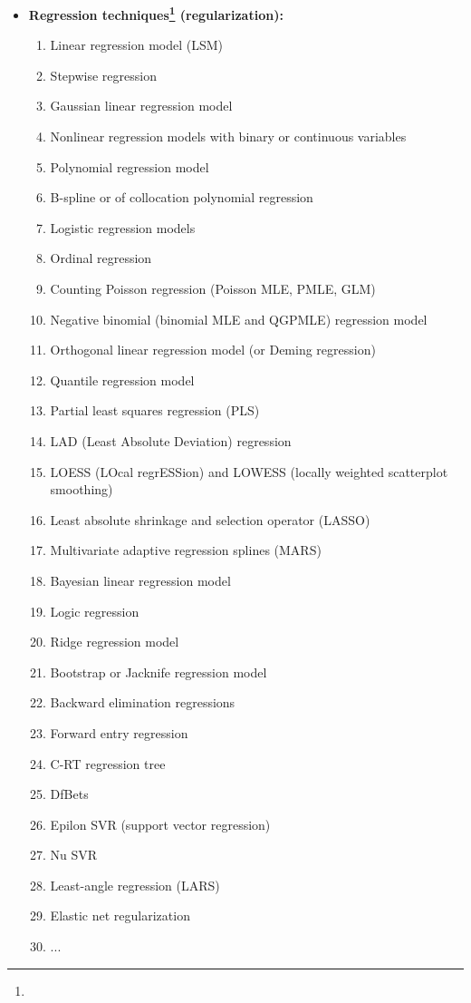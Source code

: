 \begin{itemize}
		\item \textbf{Regression techniques\footnote{} (regularization):}
		\begin{multicols}{2}
		\begin{enumerate}
			\item Linear regression model (LSM)
			\item Stepwise regression
			\item Gaussian linear regression model		
			\item Nonlinear regression models with binary or continuous variables 
			\item Polynomial regression model 
			\item B-spline or of collocation polynomial regression		
			\item Logistic regression models
			\item Ordinal regression
			\item Counting Poisson regression (Poisson MLE, PMLE, GLM) 
			\item Negative binomial (binomial MLE and QGPMLE) regression model		
			\item Orthogonal linear regression model (or Deming regression)
			\item Quantile regression model	
			\item Partial least squares regression (PLS)
			\item LAD (Least Absolute Deviation) regression 		
			\item LOESS (LOcal regrESSion) and LOWESS (locally weighted scatterplot smoothing)		
			\item Least absolute shrinkage and selection operator (LASSO)
			\item Multivariate adaptive regression splines (MARS)		
			\item Bayesian linear regression model
			\item Logic regression
			\item Ridge regression model 		
			\item Bootstrap or Jacknife regression model
			\item Backward elimination regressions
			\item Forward entry regression
			\item C-RT regression tree
			\item DfBets
			\item Epilon SVR (support vector regression)
			\item Nu SVR
			\item Least-angle regression (LARS)
			\item Elastic net regularization 
			\item ...
		\end{enumerate}
		\end{multicols}
		

\end{itemize}
